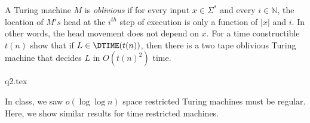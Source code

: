 \documentclass[12pt, a4paper,answers]{exam}
\newcommand{\N}{\mathbb{N}}
\begin{document}
\begin{questions}



A Turing machine $M$ is \textit{oblivious} if for every input $x \in \Sigma^*$ and every $i \in \N$, the location of $M's$ head at the $i^{th}$ step of execution is only a function of $|x|$ and $i$. In other words, the head movement does not depend on $x$. For a time constructible $t(n)$ show that if $L \in \DTIME(t(n))$, then there is a two tape oblivious Turing machine that decides $L$ in $O(t(n)^2)$ time.

\begin{solution}
        {q2.tex}
\end{solution}



In class, we saw $o(\log \log n)$ space restricted Turing machines must be regular. Here, we show similar results for time restricted machines.


\end{questions}
\end{document}

